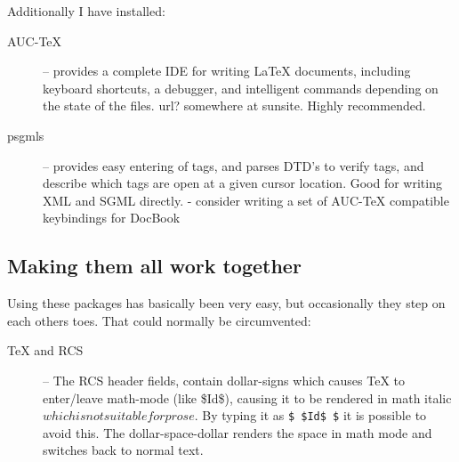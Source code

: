 Additionally I have installed:


\begin{description}
\item[AUC-TeX] -- provides a complete IDE for writing {\LaTeX}
  documents, including keyboard shortcuts, a debugger, and intelligent
  commands depending on the state of the files.  \textsf{url?
    somewhere at sunsite}.  Highly recommended.
\item[psgmls] -- provides easy entering of tags, and parses DTD's to
  verify tags, and describe which tags are open at a given cursor
  location.   Good for writing XML and SGML directly.
   - \textsf{consider writing a set of AUC-TeX
    compatible keybindings for DocBook}
\end{description}



\subsection{Making them all work together}
\label{sec:making-them-all-work-together}

Using these packages has basically been very easy, but occasionally
they step on each others toes.  That could normally be circumvented:

\begin{description}
\item[{\TeX} and RCS] -- The RCS header fields, contain dollar-signs
  which causes {\TeX} to enter/leave math-mode (like
  \mbox{\$I}\mbox{d\$}), causing it to be rendered in math italic
  $which is not suitable for prose$.  By typing it as \texttt{\$
    \${}Id\$ \$} it is possible to avoid this. The dollar-space-dollar
  renders the space in math mode and switches back to normal text.


\end{description}

